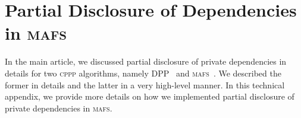 \documentclass{article}
\newcommand{\cppp}{\textsc {cppp}\xspace}
\newcommand{\mafs}{\textsc {mafs}\xspace}
\newcommand{\dpp}{\textsc {DPP}\xspace}
\theoremstyle{remark}
\begin{document}
\section{Partial Disclosure of Dependencies in \mafs}
\label{scn:RevisedMAFS}

In the main article, we discussed partial disclosure of private dependencies in details for two \cppp algorithms, namely \dpp~\cite{maliah2018action} and \mafs~\cite{nissim2014distributed}. We described the former in details and the latter in a very high-level manner. In this technical appendix, we provide more details on how we implemented partial disclosure of private dependencies in \mafs. 

\begin{algorithm}[b!]
		\caption{MAFS for agent $r_i$ }
		\label{alg:MAFS}
		
		\MAFS{
		    Initialize a set of dependencies $D$ that are not allowed to be revealed\label{line:initDependenciesNotAllowed}\\
			Insert $I$ into open list\\
			\While{solution not found}{ \label{line:final_verification} %
				\textbf{foreach} message $m$ call \textbf{process-message($m$)}\\
				$s\leftarrow$ \textbf{extract-min}(open list) \label{line:extract_min}\\
				\textbf{expand($s$)}\\
			}
		}
		
		
		\label{alg:process-message}
		\process{
			
}
\end{algorithm}
\end{document}
